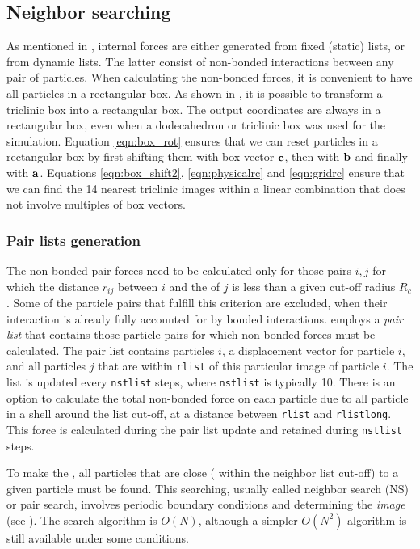 \subsection{Neighbor searching}
\label{subsec:ns}
As mentioned in , internal forces are
either generated from fixed (static) lists, or from dynamic lists.
The latter consist of non-bonded interactions between any pair of particles.
When calculating the non-bonded forces, it is convenient to have all
particles in a rectangular box.
As shown in , it is possible to transform a
triclinic box into a rectangular box.
The output coordinates are always in a rectangular box, even when a
dodecahedron or triclinic box was used for the simulation.
Equation \ref{eqn:box_rot} ensures that we can reset particles
in a rectangular box by first shifting them with
box vector ${\bf c}$, then with ${\bf b}$ and finally with ${\bf a}$.
Equations \ref{eqn:box_shift2}, \ref{eqn:physicalrc} and \ref{eqn:gridrc}
ensure that we can find the 14 nearest triclinic images within
a linear combination that does not involve multiples of box vectors.

\subsubsection{Pair lists generation}
The non-bonded pair forces need to be calculated only for those pairs
$i,j$  for which the distance $r_{ij}$ between $i$ and the 
of $j$ is less than a given cut-off radius $R_c$. Some of the particle
pairs that fulfill this criterion are excluded, when their interaction
is already fully accounted for by bonded interactions.  {\gromacs}
employs a {\em pair list} that contains those particle pairs for which
non-bonded forces must be calculated.  The pair list contains particles
$i$, a displacement vector for particle $i$, and all particles $j$ that
are within \verb'rlist' of this particular image of particle $i$.  The
list is updated every \verb'nstlist' steps, where \verb'nstlist' is
typically 10. There is an option to calculate the total non-bonded
force on each particle due to all particle in a shell around the
list cut-off, {\ie} at a distance between \verb'rlist' and
\verb'rlistlong'.  This force is calculated during the pair list update
and  retained during \verb'nstlist' steps.

To make the , all particles that are close
({\ie} within the neighbor list cut-off) to a given particle must be found.
This searching, usually called neighbor search (NS) or pair search,
involves periodic boundary conditions and determining the {\em image}
(see ). The search algorithm is $O(N)$, although a simpler
$O(N^2)$ algorithm is still available under some conditions.

